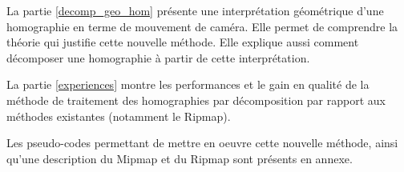 	La partie \ref{decomp_geo_hom} présente une interprétation géométrique d'une homographie en terme de mouvement de caméra. Elle permet de comprendre la théorie qui justifie cette nouvelle méthode. Elle explique aussi comment décomposer une homographie à partir de cette interprétation.

	La partie \ref{experiences} montre les performances et le gain en qualité de la méthode de traitement des homographies par décomposition par rapport aux méthodes existantes (notamment le Ripmap).

	Les pseudo-codes permettant de mettre en oeuvre cette nouvelle méthode, ainsi qu'une description du Mipmap et du Ripmap sont présents en annexe.
